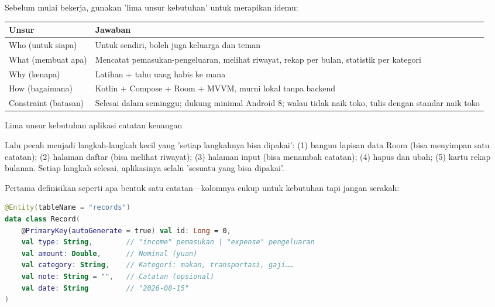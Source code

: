 


Sebelum mulai bekerja, gunakan 'lima unsur kebutuhan' untuk merapikan idemu:

\begin{center}
\begin{tabularx}{\linewidth}{|X|X|}
\hline
\textbf{Unsur} & \textbf{Jawaban} \tabularnewline
\hline
Who (untuk siapa) & Untuk sendiri, boleh juga keluarga dan teman \tabularnewline
What (membuat apa) & Mencatat pemasukan-pengeluaran, melihat riwayat, rekap per bulan, statistik per kategori \tabularnewline
Why (kenapa) & Latihan + tahu uang habis ke mana \tabularnewline
How (bagaimana) & Kotlin + Compose + Room + MVVM, murni lokal tanpa backend \tabularnewline
Constraint (batasan) & Selesai dalam seminggu; dukung minimal Android 8; walau tidak naik toko, tulis dengan standar naik toko \tabularnewline
\hline
\end{tabularx}
\end{center}

\begin{center}\small\color{gray}Lima unsur kebutuhan aplikasi catatan keuangan\end{center}

Lalu pecah menjadi langkah-langkah kecil yang 'setiap langkahnya bisa dipakai': (1) bangun lapisan data Room (bisa menyimpan satu catatan); (2) halaman daftar (bisa melihat riwayat); (3) halaman input (bisa menambah catatan); (4) hapus dan ubah; (5) kartu rekap bulanan. Setiap langkah selesai, aplikasinya selalu 'sesuatu yang bisa dipakai'.


Pertama definisikan seperti apa bentuk satu catatan—kolomnya cukup untuk kebutuhan tapi jangan serakah:

\begin{lstlisting}[language=Kotlin]
@Entity(tableName = "records")
data class Record(
    @PrimaryKey(autoGenerate = true) val id: Long = 0,
    val type: String,        // "income" pemasukan | "expense" pengeluaran
    val amount: Double,      // Nominal (yuan)
    val category: String,    // Kategori: makan, transportasi, gaji……
    val note: String = "",   // Catatan (opsional)
    val date: String         // "2026-08-15"
)
\end{lstlisting}

